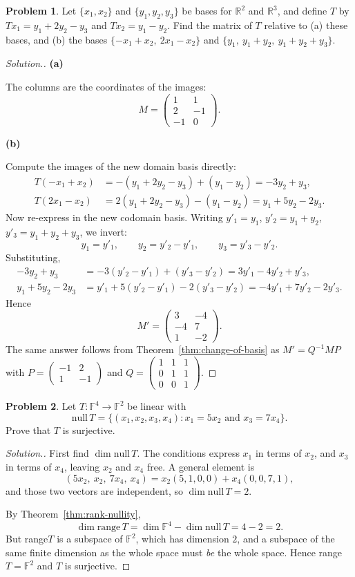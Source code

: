 \documentclass[11pt,a4paper]{article}
\theoremstyle{definition}
\newtheorem{problemx}{Problem}[section]
\newenvironment{problem}{\begin{problemx}}{\end{problemx}}
\newenvironment{solution}
  {\renewcommand{\qedsymbol}{}\begin{proof}[\textit{Solution}.]}
  {\end{proof}}
\newcommand{\subhead}[1]{%
  \par\medskip\noindent\textbf{#1}\par\nobreak\smallskip}
\begin{document}
\begin{problem}
Let $\{x_1,x_2\}$ and $\{y_1,y_2,y_3\}$ be bases for $\mathbb{R}^2$ and
$\mathbb{R}^3$, and define $T$ by $Tx_1=y_1+2y_2-y_3$ and $Tx_2=y_1-y_2$. Find
the matrix of $T$ relative to (a) these bases, and (b) the bases
$\{-x_1+x_2,\ 2x_1-x_2\}$ and $\{y_1,\ y_1+y_2,\ y_1+y_2+y_3\}$.
\end{problem}
\begin{solution}
\subhead{(a)}
The columns are the coordinates of the images:
$$M=\begin{pmatrix}1&1\\2&-1\\-1&0\end{pmatrix}.$$

\subhead{(b)}
Compute the images of the new domain basis directly:
\begin{align*}
T(-x_1+x_2)&=-(y_1+2y_2-y_3)+(y_1-y_2)=-3y_2+y_3,\\
T(2x_1-x_2)&=2(y_1+2y_2-y_3)-(y_1-y_2)=y_1+5y_2-2y_3.
\end{align*}
Now re-express in the new codomain basis. Writing $y'_1=y_1$,
$y'_2=y_1+y_2$, $y'_3=y_1+y_2+y_3$, we invert:
$$y_1=y'_1,\qquad y_2=y'_2-y'_1,\qquad y_3=y'_3-y'_2.$$
Substituting,
\begin{align*}
-3y_2+y_3&=-3(y'_2-y'_1)+(y'_3-y'_2)=3y'_1-4y'_2+y'_3,\\
y_1+5y_2-2y_3&=y'_1+5(y'_2-y'_1)-2(y'_3-y'_2)=-4y'_1+7y'_2-2y'_3.
\end{align*}
Hence
$$M'=\begin{pmatrix}3&-4\\-4&7\\1&-2\end{pmatrix}.$$
The same answer follows from Theorem~\ref{thm:change-of-basis} as
$M'=Q^{-1}MP$ with
$P=\begin{pmatrix}-1&2\\1&-1\end{pmatrix}$ and
$Q=\begin{pmatrix}1&1&1\\0&1&1\\0&0&1\end{pmatrix}$.
\end{solution}

\begin{problem}
Let $T:\mathbb{F}^4\rightarrow\mathbb{F}^2$ be linear with
$$\text{null}\,T=\{(x_1,x_2,x_3,x_4): x_1=5x_2 \text{ and } x_3=7x_4\}.$$
Prove that $T$ is surjective.
\end{problem}
\begin{solution}
First find $\dim\text{null}\,T$. The conditions express $x_1$ in terms of
$x_2$, and $x_3$ in terms of $x_4$, leaving $x_2$ and $x_4$ free. A general
element is
$$(5x_2,\ x_2,\ 7x_4,\ x_4)=x_2(5,1,0,0)+x_4(0,0,7,1),$$
and those two vectors are independent, so $\dim\text{null}\,T=2$.

By Theorem~\ref{thm:rank-nullity},
$$\dim\text{range}\,T=\dim\mathbb{F}^4-\dim\text{null}\,T=4-2=2.$$
But range$T$ is a subspace of $\mathbb{F}^2$, which has dimension $2$, and a
subspace of the same finite dimension as the whole space must \emph{be} the
whole space. Hence range$T=\mathbb{F}^2$ and $T$ is surjective.
\end{solution}
\end{document}
